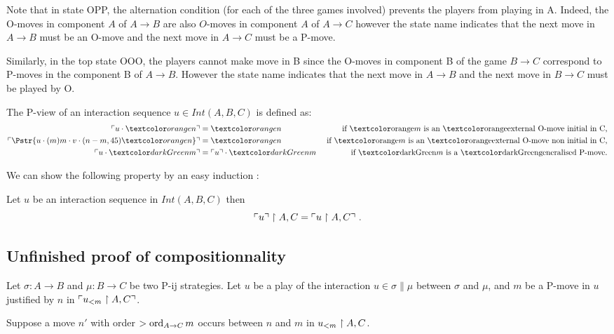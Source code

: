 Note that in state OPP, the alternation condition (for each of the three games involved) prevents the players from playing in A. Indeed, the O-moves in component $A$ of $A\rightarrow B$ are also $O$-moves in component $A$ of $A\rightarrow C$ however the state name indicates that the next move in $A\rightarrow B$ must be an O-move and the next move in $A\rightarrow C$ must be a P-move.

Similarly, in the top state OOO, the players cannot make move in B since the O-moves in component B of the game $B\rightarrow C$ correspond to P-moves in the component B of $A\rightarrow B$. However the state name indicates that the next move in $A\rightarrow B$ and the next move in $B\rightarrow C$ must be played by O.



The P-view of an interaction sequence $u \in Int(A,B,C)$ is defined as:
\begin{align*}
\pview{u\cdot \extomove{n}} &= \extomove{n} &
\mbox{ if \extomove{$m$} is an \extomove{external O-move} initial in C,}\\
\pview{\Pstr{u\cdot (m)m\cdot v \cdot (n-m,45){\extomove{n}} }} &= \extomove{n} &\mbox{ if \extomove{$m$} is an \extomove{external O-move} non initial in C,}\\
\pview{u \cdot \extpmove{m}} &= \pview{u}\cdot \extpmove{m}  & \mbox{ if \extpmove{$m$} is a \extpmove{generalised P-move}.}\\
\end{align*}

We can show the following property by an easy induction :
\begin{lemma}
\label{lem:interaction_projection}
 Let $u$ be an interaction sequence in $Int(A,B,C)$ then
$$\ulcorner u \urcorner \upharpoonright A,C = \ulcorner u \upharpoonright A,C \urcorner \ .$$
\end{lemma}

\subsection{Unfinished proof of compositionnality} 
Let $\sigma : A \rightarrow B$ and $\mu : B \rightarrow C$ be two P-ij strategies. Let $u$ be a play of the interaction $u \in \sigma \| \mu$ between $\sigma$ and $\mu$,
and $m$ be a P-move in $u$
justified by $n$ in $\ulcorner u_{<m} \upharpoonright A , C \urcorner$.

Suppose a move $n'$ with order $> \mathop{\mathrm{ord}}_{A\rightarrow C}{m}$ occurs between $n$ and $m$ in $u_{<m} \upharpoonright A,C $.

